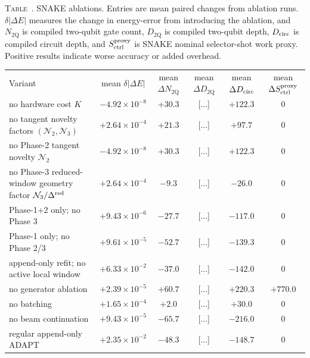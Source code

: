 \documentclass[
  reprint,
  amsmath,
  amssymb,
  aps,
  pra,
  nofootinbib,
  superscriptaddress,
  floatfix
]{revtex4-2}
\newcommand{\placeholder}[1]{\textcolor{red!70!black}{\ifmmode\left[#1\right]\else\textsf{[#1]}\fi}}
\newcommand{\twq}{\mathrm{2Q}}
\newcommand{\inlinetablecaption}[2]{%
  \refstepcounter{table}\label{#1}%
  \noindent\textsc{Table~\thetable.} #2\par\vspace{0.6ex}%
}
\begin{document}
\begin{widetext}
\inlinetablecaption{tab:ablation_matrix}{SNAKE ablations. Entries are mean paired changes from ablation runs. $\delta|\Delta E|$ measures the change in energy-error from introducing the ablation, and $N_{\twq}$ is compiled two-qubit gate count, $D_{\twq}$ is compiled two-qubit depth, $D_{\rm circ}$ is compiled circuit depth, and $S_{\rm ctrl}^{\rm proxy}$ is SNAKE nominal selector-shot work proxy. Positive results indicate worse accuracy or added overhead.}
\begin{center}
\begin{ruledtabular}
\begin{tabular}{p{}ccccc}
Variant & mean $\delta|\Delta E|$& mean $\Delta N_{\twq}$ & mean $\Delta D_{\twq}$ & mean $\Delta D_{\rm circ}$ & mean $\Delta S_{\rm ctrl}^{\rm proxy}$ \\
\colrule
no hardware cost $K$ & $-4.92\!\times\!10^{-8}$ & $+30.3$ & \placeholder{...} & $+122.3$ & $0$ \\
no tangent novelty factors $(\mathcal N_2,\mathcal N_3)$ & $+2.64\!\times\!10^{-4}$ & $+21.3$ & \placeholder{...} & $+97.7$ & $0$ \\
no Phase-2 tangent novelty $\mathcal N_2$ & $-4.92\!\times\!10^{-8}$ & $+30.3$ & \placeholder{...} & $+122.3$ & $0$ \\
no Phase-3 reduced-window geometry factor $\mathcal N_3/\Delta^{\rm red}$ & $+2.64\!\times\!10^{-4}$ & $-9.3$ & \placeholder{...} & $-26.0$ & $0$ \\
Phase-1+2 only; no Phase 3 & $+9.43\!\times\!10^{-6}$ & $-27.7$ & \placeholder{...} & $-117.0$ & $0$ \\
Phase-1 only; no Phase 2/3 & $+9.61\!\times\!10^{-5}$ & $-52.7$ & \placeholder{...} & $-139.3$ & $0$ \\
append-only refit; no active local window& $+6.33\!\times\!10^{-2}$ & $-37.0$ & \placeholder{...} & $-142.0$ & $0$ \\
no generator ablation& $+2.39\!\times\!10^{-5}$ & $+60.7$ & \placeholder{...} & $+220.3$ & $+770.0$ \\
no batching & $+1.65\!\times\!10^{-4}$ & $+2.0$ & \placeholder{...} & $+30.0$ & $0$ \\
no beam continuation & $+9.43\!\times\!10^{-5}$ & $-65.7$ & \placeholder{...} & $-216.0$ & $0$ \\
regular append-only ADAPT & $+2.35\!\times\!10^{-2}$ & $-48.3$ & \placeholder{...} & $-148.7$ & $0$ \\
\end{tabular}
\end{ruledtabular}
\end{center}
\end{widetext}
\end{document}

